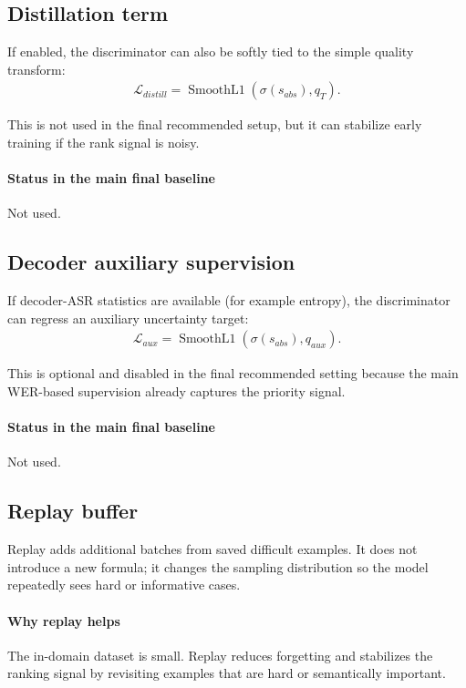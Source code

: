 \documentclass[11pt]{article}
\begin{document}
\subsection{Distillation term}
If enabled, the discriminator can also be softly tied to the simple quality transform:
\begin{align}
    \mathcal{L}_{distill} = \operatorname{SmoothL1}(\sigma(s_{abs}), q_T).
\end{align}

This is not used in the final recommended setup, but it can stabilize early training if the rank signal is noisy.

\paragraph{Status in the main final baseline}
Not used.

\subsection{Decoder auxiliary supervision}
If decoder-ASR statistics are available (for example entropy), the discriminator can regress an auxiliary uncertainty target:
\begin{align}
    \mathcal{L}_{aux} = \operatorname{SmoothL1}(\sigma(s_{abs}), q_{aux}).
\end{align}

This is optional and disabled in the final recommended setting because the main WER-based supervision already captures the priority signal.

\paragraph{Status in the main final baseline}
Not used.

\subsection{Replay buffer}
Replay adds additional batches from saved difficult examples. It does not introduce a new formula; it changes the sampling distribution so the model repeatedly sees hard or informative cases.

\paragraph{Why replay helps}
The in-domain dataset is small. Replay reduces forgetting and stabilizes the ranking signal by revisiting examples that are hard or semantically important.
\end{document}
